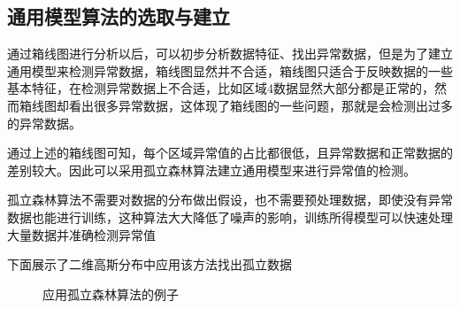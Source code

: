 \documentclass[UTF8]{article}
\begin{document}
			\subsection{通用模型算法的选取与建立}
			\par 通过箱线图进行分析以后，可以初步分析数据特征、找出异常数据，但是为了建立通用模型来检测异常数据，箱线图显然并不合适，箱线图只适合于反映数据的一些基本特征，在检测异常数据上不合适，比如区域4数据显然大部分都是正常的，然而箱线图却看出很多异常数据，这体现了箱线图的一些问题，那就是会检测出过多的异常数据。
			\par 通过上述的箱线图可知，每个区域异常值的占比都很低，且异常数据和正常数据的差别较大。因此可以采用孤立森林算法建立通用模型来进行异常值的检测。
			\par 孤立森林算法不需要对数据的分布做出假设，也不需要预处理数据，即使没有异常数据也能进行训练，这种算法大大降低了噪声的影响，训练所得模型可以快速处理大量数据并准确检测异常值\cite[iForest]{liu2008isolation}
			\par 下面展示了二维高斯分布中应用该方法找出孤立数据\cite{wikiif}
			\begin{figure} [!h]
				\centering
				\caption{应用孤立森林算法的例子}
				\label{example}
			\end{figure}
\end{document}
